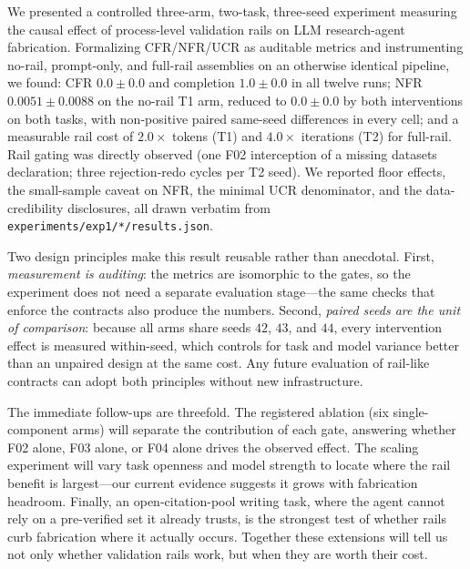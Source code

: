 \documentclass[10pt,twocolumn]{article}
\begin{document}
We presented a controlled three-arm, two-task, three-seed experiment measuring the causal effect of process-level validation rails on LLM research-agent fabrication. Formalizing CFR/NFR/UCR as auditable metrics and instrumenting no-rail, prompt-only, and full-rail assemblies on an otherwise identical pipeline, we found: CFR $0.0 \pm 0.0$ and completion $1.0 \pm 0.0$ in all twelve runs; NFR $0.0051 \pm 0.0088$ on the no-rail T1 arm, reduced to $0.0 \pm 0.0$ by both interventions on both tasks, with non-positive paired same-seed differences in every cell; and a measurable rail cost of $2.0\times$ tokens (T1) and $4.0\times$ iterations (T2) for full-rail. Rail gating was directly observed (one F02 interception of a missing datasets declaration; three rejection-redo cycles per T2 seed). We reported floor effects, the small-sample caveat on NFR, the minimal UCR denominator, and the data-credibility disclosures, all drawn verbatim from \texttt{experiments/exp1/*/results.json}.

Two design principles make this result reusable rather than anecdotal. First, \emph{measurement is auditing}: the metrics are isomorphic to the gates, so the experiment does not need a separate evaluation stage---the same checks that enforce the contracts also produce the numbers. Second, \emph{paired seeds are the unit of comparison}: because all arms share seeds $42$, $43$, and $44$, every intervention effect is measured within-seed, which controls for task and model variance better than an unpaired design at the same cost. Any future evaluation of rail-like contracts can adopt both principles without new infrastructure.

The immediate follow-ups are threefold. The registered ablation (six single-component arms) will separate the contribution of each gate, answering whether F02 alone, F03 alone, or F04 alone drives the observed effect. The scaling experiment will vary task openness and model strength to locate where the rail benefit is largest---our current evidence suggests it grows with fabrication headroom. Finally, an open-citation-pool writing task, where the agent cannot rely on a pre-verified set it already trusts, is the strongest test of whether rails curb fabrication where it actually occurs. Together these extensions will tell us not only whether validation rails work, but when they are worth their cost.



\end{document}
